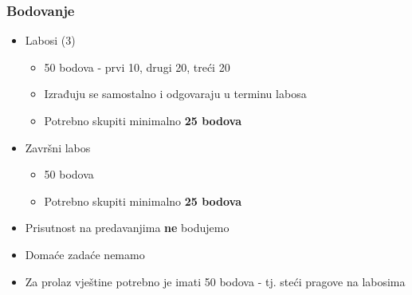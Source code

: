 \documentclass[t]{beamer}
\begin{document}
\begin{frame}
	\frametitle{Bodovanje}
	\begin{itemize}
		\item Labosi (3)
		\begin{itemize}
			\item 50 bodova - prvi 10, drugi 20, treći 20
			\item Izrađuju se samostalno i odgovaraju u terminu labosa
			\item Potrebno skupiti minimalno \textbf{25 bodova}
		\end{itemize}
		\item Završni labos
		\begin{itemize}
			\item 50 bodova
			\item Potrebno skupiti minimalno \textbf{25 bodova}
		\end{itemize}

		\item Prisutnost na predavanjima \textbf{ne} bodujemo
		\item Domaće zadaće nemamo
		\item Za prolaz vještine potrebno je imati 50 bodova - tj. steći pragove na labosima
	\end{itemize}
\end{frame}
\end{document}
